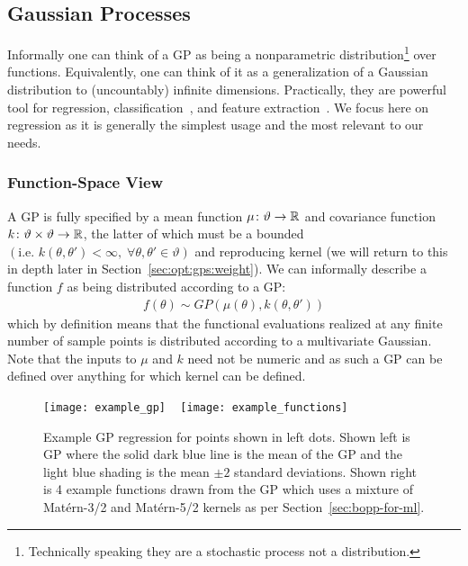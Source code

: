 
\subsection{Gaussian Processes}
\label{sec:opt:GPs}

Informally one can think of a GP \citep{rasmussen2006gaussian} as being a nonparametric 
distribution\footnote{Technically speaking they are a stochastic process not a distribution.} over functions.
Equivalently, one can think of it as a generalization of a Gaussian distribution
to (uncountably) infinite dimensions.  Practically, they are powerful tool for regression, classification~\cite{kuss2005assessing}, 
and feature extraction~\cite{lawrence2004gaussian}.  We focus here on regression as it is generally
the simplest usage and the most relevant to our needs.

\subsubsection{Function-Space View}
\label{sec:opt:GPs:function}

A GP is fully specified by a mean function $\mu \colon \vartheta \rightarrow \mathbb{R}$ and covariance function 
$k \colon \vartheta \times \vartheta \rightarrow \mathbb{R}$, the latter of which must be a bounded 
$\left(\text{i.e. }k\left(\theta,\theta'\right)<\infty, \; \forall \theta,\theta' \in \vartheta\right)$ 
and reproducing kernel (we will return to this in depth later in Section~\ref{sec:opt:gps:weight}).  
We can informally describe a function $f$ as being distributed 
according to a GP:
\begin{align}
\label{eq:GP}
f \left(\theta\right) \sim GP \left(\mu\left(\theta\right), k\left(\theta,\theta'\right)\right)
\end{align}
which by definition means that the functional evaluations realized at any finite number of sample points is distributed according to a multivariate Gaussian. Note that the inputs to $\mu$ and $k$ need not be numeric and as such a GP can be defined over anything for which kernel can be defined.

\begin{figure}[t]
	\texttt{[image: example\_gp]}
		~
	\texttt{[image: example\_functions]}
	\caption{Example GP regression for points shown in left dots.  Shown left is GP where
		the solid dark blue line is the mean of the GP and the light blue shading is the
		mean $\pm2$ standard deviations.  Shown right is 4 example functions drawn
		from the GP which uses a mixture of Mat\'{e}rn-3/2 and Mat\'{e}rn-5/2 kernels
		as per Section~\ref{sec:bopp-for-ml}.\label{fig:opt:example_gp}}
\end{figure}

